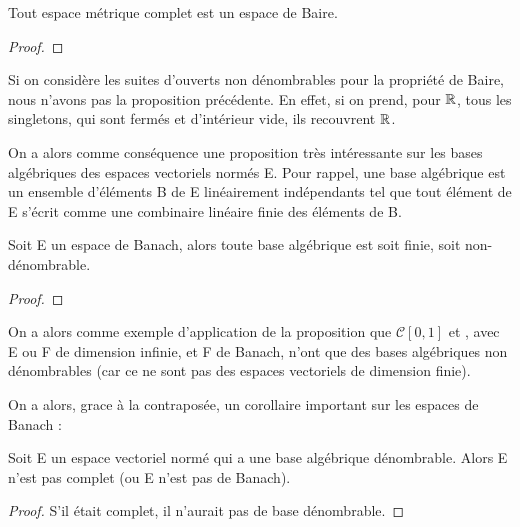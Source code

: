\begin{theorem} 
	Tout espace métrique complet est un espace de Baire.
\end{theorem}

\begin{proof}
	
\end{proof}

\begin{remarque}
	Si on considère les suites d'ouverts non dénombrables pour la propriété de
	Baire, nous n'avons pas la proposition précédente.
	En effet, si on prend, pour $\mathbb{R}$, tous les singletons, qui sont fermés
	et d'intérieur vide, ils recouvrent $\mathbb{R}$.
\end{remarque}

On a alors comme conséquence une proposition très intéressante sur les bases
algébriques des espaces vectoriels normés E. Pour rappel, une base algébrique
est un ensemble d'éléments B de E linéairement indépendants tel que tout élément
de E s'écrit comme une combinaire linéaire finie des éléments de B.

\begin{proposition}
	Soit E un espace de Banach, alors toute base algébrique est soit finie, soit
	non-dénombrable.
\end{proposition}

\begin{proof}
	
\end{proof}

On a alors comme exemple d'application de la proposition que $\mathcal{C}[0, 1]$
et , avec E ou F de dimension infinie, et F de Banach,
n'ont que des bases algébriques non dénombrables (car ce ne sont pas des espaces
vectoriels de dimension finie).

On a alors, grace à la contraposée, un corollaire important sur les espaces de
Banach :

\begin{corollary}
	Soit E un espace vectoriel normé qui a une base algébrique dénombrable.
	Alors E n'est pas complet (ou E n'est pas de Banach).
\end{corollary}

\begin{proof}
	S'il était complet, il n'aurait pas de base dénombrable.
\end{proof}
